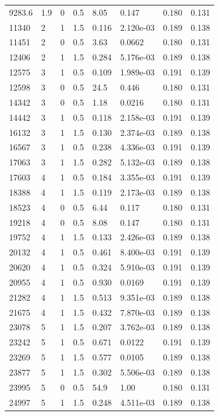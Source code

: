 \documentclass[preview]{standalone}
\begin{document}
{{\begin{tabular}{L{1.2cm}C{1.2cm} C{0.3cm}C{0.5cm} C{1.4cm}C{1.4cm} C{1.4cm}C{1.4cm}}
  9283.6  &   1.9  & 0     & 0.5 &  8.05  & 0.147  & 0.180 &  0.131   \\ 
  11340  &     2  & 1     & 1.5 &  0.116  & 2.120e-03  & 0.189 &  0.138   \\ 
  11451  &     2  & 0     & 0.5 &  3.63  & 0.0662  & 0.180 &  0.131   \\ 
  12406  &     2  & 1     & 1.5 &  0.284  & 5.176e-03  & 0.189 &  0.138   \\ 
  12575  &     3  & 1     & 0.5 &  0.109  & 1.989e-03  & 0.191 &  0.139   \\ 
  12598  &     3  & 0     & 0.5 &  24.5  & 0.446  & 0.180 &  0.131   \\ 
  14342  &     3  & 0     & 0.5 &  1.18  & 0.0216  & 0.180 &  0.131   \\ 
  14442  &     3  & 1     & 0.5 &  0.118  & 2.158e-03  & 0.191 &  0.139   \\ 
  16132  &     3  & 1     & 1.5 &  0.130  & 2.374e-03  & 0.189 &  0.138   \\ 
  16567  &     3  & 1     & 0.5 &  0.238  & 4.336e-03  & 0.191 &  0.139   \\ 
  17063  &     3  & 1     & 1.5 &  0.282  & 5.132e-03  & 0.189 &  0.138   \\ 
  17603  &     4  & 1     & 0.5 &  0.184  & 3.355e-03  & 0.191 &  0.139   \\ 
  18388  &     4  & 1     & 1.5 &  0.119  & 2.173e-03  & 0.189 &  0.138   \\ 
  18523  &     4  & 0     & 0.5 &  6.44  & 0.117  & 0.180 &  0.131   \\ 
  19218  &     4  & 0     & 0.5 &  8.08  & 0.147  & 0.180 &  0.131   \\ 
  19752  &     4  & 1     & 1.5 &  0.133  & 2.426e-03  & 0.189 &  0.138   \\ 
  20132  &     4  & 1     & 0.5 &  0.461  & 8.400e-03  & 0.191 &  0.139   \\ 
  20620  &     4  & 1     & 0.5 &  0.324  & 5.910e-03  & 0.191 &  0.139   \\ 
  20955  &     4  & 1     & 0.5 &  0.930  & 0.0169  & 0.191 &  0.139   \\ 
  21282  &     4  & 1     & 1.5 &  0.513  & 9.351e-03  & 0.189 &  0.138   \\ 
  21675  &     4  & 1     & 1.5 &  0.432  & 7.870e-03  & 0.189 &  0.138   \\ 
  23078  &     5  & 1     & 1.5 &  0.207  & 3.762e-03  & 0.189 &  0.138   \\ 
  23242  &     5  & 1     & 0.5 &  0.671  & 0.0122  & 0.191 &  0.139   \\ 
  23269  &     5  & 1     & 1.5 &  0.577  & 0.0105  & 0.189 &  0.138   \\ 
  23877  &     5  & 1     & 1.5 &  0.302  & 5.506e-03  & 0.189 &  0.138   \\ 
  23995  &     5  & 0     & 0.5 &  54.9  & 1.00  & 0.180 &  0.131   \\ 
  24997  &     5  & 1     & 1.5 &  0.248  & 4.511e-03  & 0.189 &  0.138   \\ 
\hline 
\end{tabular} 

}}
\end{document}
